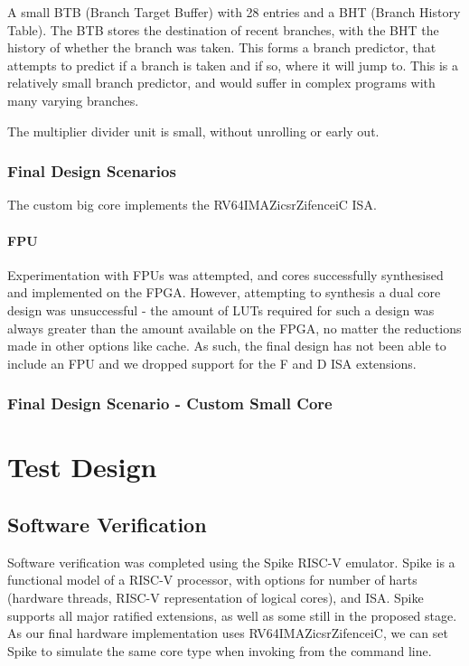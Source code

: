 A small BTB (Branch Target Buffer) with 28 entries and a BHT (Branch History Table). The BTB stores the destination of recent branches, with the BHT the history of whether the branch was taken. This forms a branch predictor, that attempts to predict if a branch is taken and if so, where it will jump to. This is a relatively small branch predictor, and would suffer in complex programs with many varying branches.

The multiplier divider unit is small, without unrolling or early out. 

\subsection{Final Design Scenarios}
The custom big core implements the RV64IMAZicsrZifenceiC ISA.

\subsubsection{FPU} %
Experimentation with FPUs was attempted, and cores successfully synthesised and implemented on the FPGA. However, attempting to synthesis a dual core design was unsuccessful - the amount of LUTs required for such a design was always greater than the amount available on the FPGA, no matter the reductions made in other options like cache. As such, the final design has not been able to include an FPU and we dropped support for the F and D ISA extensions.

\subsection{Final Design Scenario - Custom Small Core}

\chapter{Test Design}
\label{ch:test_design}

\section{Software Verification}
Software verification was completed using the Spike RISC-V emulator. Spike is a functional model of a RISC-V processor, with options for number of harts (hardware threads, RISC-V representation of logical cores), and ISA. Spike supports all major ratified extensions, as well as some still in the proposed stage. As our final hardware implementation uses RV64IMAZicsrZifenceiC, we can set Spike to simulate the same core type when invoking from the command line.

